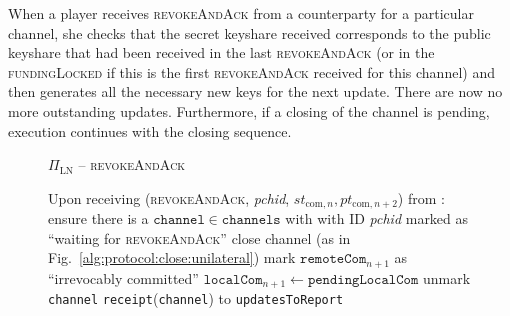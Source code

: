   When a player receives \textsc{revokeAndAck} from a counterparty for a
  particular channel, she checks that the secret keyshare received corresponds
  to the public keyshare that had been received in the last
  \textsc{revokeAndAck} (or in the \textsc{fundingLocked} if this is the first
  \textsc{revokeAndAck} received for this channel) and then generates all the
  necessary new keys for the next update. There are now no more outstanding
  updates. Furthermore, if a closing of the channel is pending, execution
  continues with the closing sequence.

  \begin{figure}[H]
    \begin{protocolbox}{$\Pi_{\mathrm{LN}}$ -- \textsc{revokeAndAck}}
      \begin{algorithmic}[1]
        \State Upon receiving (\textsc{revokeAndAck}, \textit{pchid},
        $st_{\mathrm{com}, n}, pt_{\mathrm{com}, n+2}$) from \bob:
        \Indent
          \State ensure there is a $\mathtt{channel} \in \mathtt{channels}$ with
          \bob{} with ID \textit{pchid} marked as ``waiting for
          \textsc{revokeAndAck}''
          \label{alg:protocol:pay:revokeAndAck:ensure}
           
            \State close channel (as in
            Fig.~\ref{alg:protocol:close:unilateral})
            \State \Return
          \EndIf
          \State mark $\mathtt{remoteCom}_{n+1}$ as ``irrevocably committed''
          \State $\mathtt{localCom}_{n+1} \gets \mathtt{pendingLocalCom}$
          \State unmark \texttt{channel}
          \State {} \texttt{receipt}(\texttt{channel}) to
          \texttt{updatesToReport}
          \label{alg:protocol:pay:raa:report:updates}
          \State {}
\end{algorithmic}
\end{protocolbox}
\end{figure}
